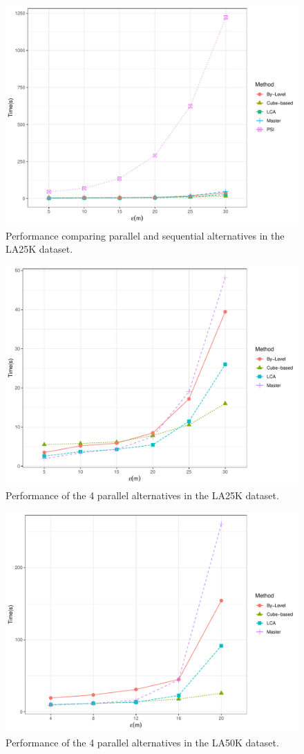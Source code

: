 \begin{figure}
    \centering
    \includegraphics[width=0.75\linewidth]{figures/plots/08_sequential_parallel/la25k_e_bfe_psi.pdf}
    \caption{Performance comparing parallel and sequential alternatives in the LA25K dataset.}\label{fig:la25k_e_bfe_psi}
\end{figure}

\begin{figure}
    \centering
    \includegraphics[width=0.75\linewidth]{figures/plots/08_sequential_parallel/la25k_e.pdf}
    \caption{Performance of the 4 parallel alternatives in the LA25K dataset.}\label{fig:la25k_e}
\end{figure}

\begin{figure}
    \centering
    \includegraphics[width=0.75\linewidth]{figures/plots/08_sequential_parallel/la50k_e.pdf}
    \caption{Performance of the 4 parallel alternatives in the LA50K dataset.}\label{fig:la50k_e}
\end{figure}
